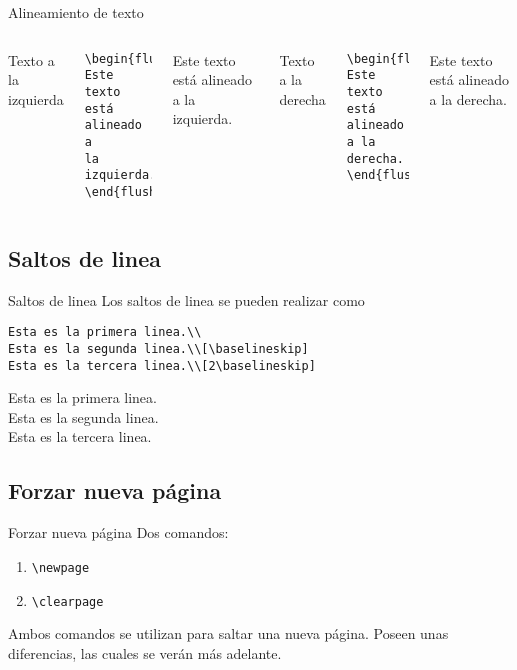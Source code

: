 \documentclass[../slides.tex]{subfiles}
\begin{document}
        \begin{frame}[fragile]{Alineamiento de texto}
        \begin{columns}
                Texto a la izquierda
                    \begin{verbatim}
\begin{flushleft}
Este texto está alineado a
la izquierda.
\end{flushleft}
                    \end{verbatim}
\begin{flushleft}
Este texto está alineado a la izquierda.
\end{flushleft}
                Texto a la derecha
                    \begin{verbatim}
\begin{flushright}
Este texto está alineado
a la derecha.
\end{flushright}
                    \end{verbatim}
\begin{flushright}
Este texto está alineado a la derecha.
\end{flushright}
        \end{columns}
    \end{frame}

    \subsection{Saltos de linea}

    \begin{frame}[fragile]{Saltos de linea}
        Los saltos de linea se pueden realizar como
            \begin{verbatim}
Esta es la primera linea.\\
Esta es la segunda linea.\\[\baselineskip]
Esta es la tercera linea.\\[2\baselineskip]
            \end{verbatim}
Esta es la primera linea.\\
Esta es la segunda linea.\\[\baselineskip]
Esta es la tercera linea.\\[2\baselineskip]
    \end{frame}

    \subsection{Forzar nueva página}
    \begin{frame}{Forzar nueva página}
        Dos comandos:
            \begin{enumerate}
                \item \texttt{\textbackslash newpage}
                \item \texttt{\textbackslash clearpage}
            \end{enumerate}
        Ambos comandos se utilizan para saltar una nueva página. Poseen unas diferencias, las cuales se verán más adelante.
    \end{frame}
    
\end{document}
